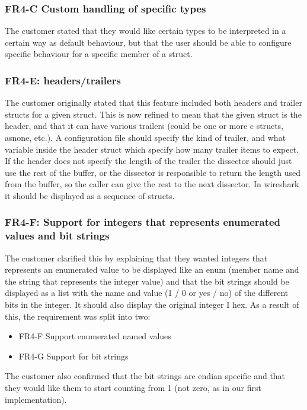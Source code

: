 \subsubsection{FR4-C Custom handling of specific types}
The customer stated that they would like certain types to be interpreted in a certain way as default behaviour, but that the user should be able to configure specific behaviour for a specific \gls{member} of a \gls{struct}.

\subsubsection{FR4-E: \Glspl{header}/\gls{trailers}}
The customer originally stated that this feature included both \glspl{header} and trailer \glspl{struct} for a given \gls{struct}. This is now refined to mean that the given \gls{struct} is the \gls{header}, and that it can have various \gls{trailers} (could be one or more \Gls{c} \glspl{struct}, \gls{asnone}, etc.). A configuration file should specify the kind of trailer, and what variable inside the \gls{header} \gls{struct} which specify how many trailer items to expect. If the \gls{header} does not specify the length of the trailer the \gls{dissector} should just use the rest of the buffer, or the \gls{dissector} is responsible to return the length used from the buffer, so the caller can give the rest to the next \gls{dissector}.
In \Gls{wireshark} it should be displayed as a sequence of \glspl{struct}.

\subsubsection{FR4-F: Support for \glspl{integer} that represents enumerated values and \glspl{bit string}}
The customer clarified this by explaining that they wanted \glspl{integer} that represents an enumerated value to be displayed like an \gls{enum} (\gls{member} name and the \gls{string} that represents the \gls{integer} value) and that the \glspl{bit string} should be displayed as a list with the name and value (1 / 0 or yes / no) of the different bits in the \gls{integer}. It should also display the original \gls{integer} I hex. As a result of this, the requirement was split into two:
\begin{itemize}
\item FR4-F	Support \glspl{enumerated named value}
\item FR4-G	Support for \glspl{bit string}
\end{itemize}
The customer also confirmed that the \glspl{bit string} are \gls{endian} specific and that they would like them to start counting from 1 (not zero, as in our first implementation).

